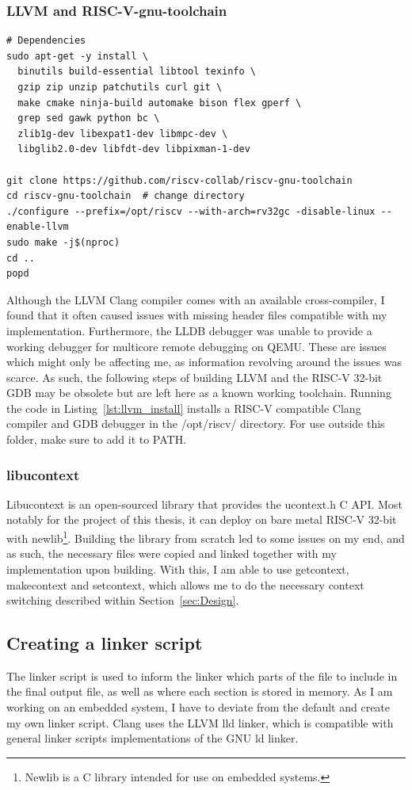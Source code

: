 \subsubsection*{LLVM and RISC-V-gnu-toolchain}
\begin{lstlisting}[caption=Installing LLVM compiler infastructure with RISC-V
32-bit as native target., label=lst:llvm_install, float=h]
# Dependencies
sudo apt-get -y install \
  binutils build-essential libtool texinfo \
  gzip zip unzip patchutils curl git \
  make cmake ninja-build automake bison flex gperf \
  grep sed gawk python bc \
  zlib1g-dev libexpat1-dev libmpc-dev \
  libglib2.0-dev libfdt-dev libpixman-1-dev

git clone https://github.com/riscv-collab/riscv-gnu-toolchain
cd riscv-gnu-toolchain  # change directory
./configure --prefix=/opt/riscv --with-arch=rv32gc -disable-linux --enable-llvm
sudo make -j$(nproc)
cd ..
popd
\end{lstlisting}
Although the LLVM Clang compiler comes with an available cross-compiler, I found
that it often caused issues with missing header files compatible with my
implementation. Furthermore, the LLDB debugger was unable to provide a working
debugger for multicore remote debugging on QEMU. These are issues which might
only be affecting me, as information revolving around the issues was scarce. As
such, the following steps of building LLVM and the RISC-V 32-bit GDB may be
obsolete but are left here as a known working toolchain. Running the code in
Listing~\ref{lst:llvm_install} installs a RISC-V compatible Clang compiler and
GDB debugger in the /opt/riscv/ directory. For use outside this folder, make
sure to add it to PATH.

\subsubsection*{libucontext}
Libucontext is an open-sourced library that provides the ucontext.h C API. Most
notably for the project of this thesis, it can deploy on bare metal RISC-V
32-bit with newlib\footnote{Newlib is a C library intended for use on embedded
systems.}. Building the library from scratch led to some issues on my end, and
as such, the necessary files were copied and linked together with my
implementation upon building. With this, I am able to use getcontext,
makecontext and setcontext, which allows me to do the necessary context
switching described within Section~\ref{sec:Design}.


\subsection{Creating a linker script}
The linker script is used to inform the linker which parts of the file to
include in the final output file, as well as where each section is stored in
memory. As I am working on an embedded system, I have to deviate from the
default and create my own linker script. Clang uses the LLVM lld linker, which
is compatible with general linker scripts implementations of the GNU ld
linker.\cite{llvm-org-linker}

